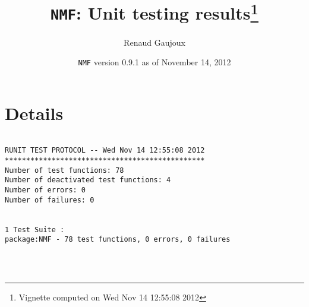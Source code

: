 \documentclass[10pt]{article}
\author{Renaud Gaujoux}
\title{\texttt{NMF}: Unit testing results\footnote{Vignette computed  on Wed Nov 14 12:55:08 2012}}
\date{\texttt{NMF} version 0.9.1 as of November 14, 2012}
\begin{document}
\maketitle

\section{Details}
\begin{verbatim}

RUNIT TEST PROTOCOL -- Wed Nov 14 12:55:08 2012 
*********************************************** 
Number of test functions: 78 
Number of deactivated test functions: 4 
Number of errors: 0 
Number of failures: 0 

 
1 Test Suite : 
package:NMF - 78 test functions, 0 errors, 0 failures




\end{verbatim}
\end{document}
